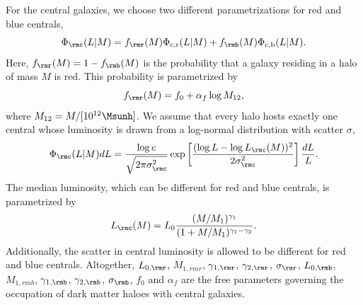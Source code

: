\documentclass[fleqn,usenatbib,useAMS]{mnras}
\begin{document}
For the central galaxies, we choose two different parametrizations for red and blue centrals,
\begin{equation}
\Phi_\rmc (L | M) = f_\rmr (M) \Phi_{\rm c, r}(L | M)+ f_\rmb (M) \Phi_{\rm c, b}(L | M).
\end{equation}
Here, $f_\rmr (M) = 1 - f_\rmb (M)$ is the probability that a galaxy residing in a halo of mass $M$ is red. This probability is parametrized by
\begin{equation}
f_\rmr (M) = f_0 + \alpha_f \log M_{12},
\label{eq:colour_cen}
\end{equation}
where $M_{12} = M / [10^{12} \Msunh]$. We assume that every halo hosts exactly one central whose luminosity is drawn from a log-normal distribution with scatter $\sigma$,
\begin{equation}
\Phi_\rmc (L | M) dL = \frac{\log e}{\sqrt{2\pi \sigma_\rmc^2}} \exp \left[ \frac{(\log L - \log L_\rmc (M))^2}{2 \sigma_\rmc^2} \right] \frac{dL}{L}.
\end{equation}
The median luminosity, which can be different for red and blue centrals, is parametrized by
\begin{equation}
L_\rmc (M) = L_0 \frac{(M / M_1)^{\gamma_1}}{(1 + M / M_1)^{\gamma_1 - \gamma_2}}.
\end{equation}
Additionally, the scatter in central luminosity is allowed to be different for red and blue centrals. Altogether, $L_{0, \rmr}$, $M_{1, rmr}$, $\gamma_{1, \rmr}$, $\gamma_{2, \rmr}$, $\sigma_\rmr$, $L_{0, \rmb}$, $M_{1, rmb}$, $\gamma_{1, \rmb}$, $\gamma_{2, \rmb}$, $\sigma_\rmb$, $f_0$ and $\alpha_f$ are the free parameters governing the occupation of dark matter haloes with central galaxies.
\end{document}

